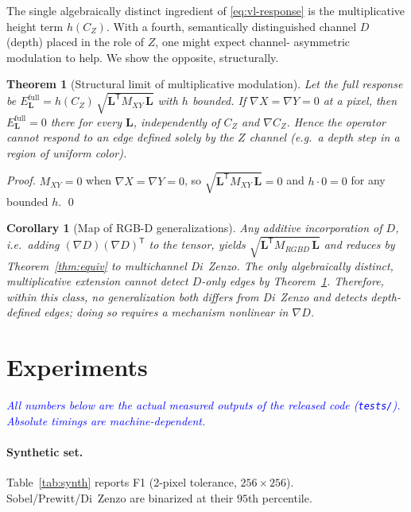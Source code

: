 \documentclass[11pt,a4paper]{article}
\newcommand{\note}[1]{\textcolor{blue}{\textit{#1}}}
\theoremstyle{plain}
\newtheorem{theorem}{Theorem}
\newtheorem{corollary}{Corollary}
\theoremstyle{definition}
\newcommand{\Lvec}{\mathbf{L}}
\newcommand{\grad}{\nabla}
\newcommand{\Mxy}{M_{XY}}
\newcommand{\transpose}{^{\mathsf T}}
\begin{document}
The single algebraically distinct ingredient of \eqref{eq:vl-response} is the
multiplicative height term $h(C_Z)$. With a fourth, semantically distinguished
channel $D$ (depth) placed in the role of $Z$, one might expect channel-
asymmetric modulation to help. We show the opposite, structurally.

\begin{theorem}[Structural limit of multiplicative modulation]
\label{thm:mult}
Let the full response be $E_{\Lvec}^{\mathrm{full}} = h(C_Z)\,
\sqrt{\Lvec\transpose \Mxy\,\Lvec}$ with $h$ bounded. If
$\grad X = \grad Y = 0$ at a pixel, then $E_{\Lvec}^{\mathrm{full}} = 0$ there
for every $\Lvec$, independently of $C_Z$ and $\grad C_Z$. Hence the operator
cannot respond to an edge defined solely by the $Z$ channel (e.g.\ a depth
step in a region of uniform color).
\end{theorem}

\begin{proof}
$\Mxy = 0$ when $\grad X=\grad Y=0$, so $\sqrt{\Lvec\transpose \Mxy\,\Lvec}=0$
and $h\cdot 0 = 0$ for any bounded $h$. \qed
\end{proof}

\begin{corollary}[Map of RGB-D generalizations]
\label{cor:map}
Any \emph{additive} incorporation of $D$, i.e.\ adding $(\grad D)(\grad D)
\transpose$ to the tensor, yields $\sqrt{\Lvec\transpose M_{RGBD}\,\Lvec}$ and
reduces by Theorem~\ref{thm:equiv} to multichannel Di~Zenzo. The only
algebraically distinct, \emph{multiplicative} extension cannot detect
$D$-only edges by Theorem~\ref{thm:mult}. Therefore, within this class, no
generalization both differs from Di~Zenzo and detects depth-defined edges;
doing so requires a mechanism nonlinear in $\grad D$.
\end{corollary}

\section{Experiments}
\label{sec:exp}

\note{All numbers below are the actual measured outputs of the released code
(\texttt{tests/}). Absolute timings are machine-dependent.}

\paragraph{Synthetic set.}
Table~\ref{tab:synth} reports F1 (2-pixel tolerance, $256\times256$).
Sobel/Prewitt/Di~Zenzo are binarized at their $95$th percentile.
\end{document}
